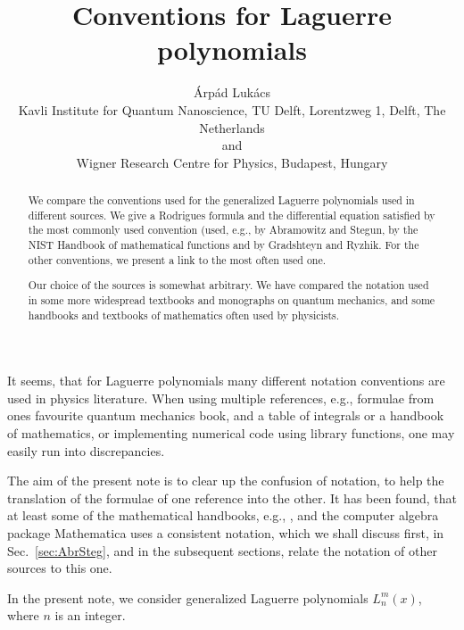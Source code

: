 \documentclass[a4paper,12pt,final]{article}
\title{Conventions for Laguerre polynomials}
\author{Árpád Lukács\\ \small Kavli Institute for Quantum Nanoscience, TU Delft, Lorentzweg 1, Delft, The Netherlands\\
\small and \\ \small Wigner Research Centre for Physics, Budapest, Hungary}
\begin{document}
\maketitle

\begin{abstract}
We compare the conventions used for the generalized Laguerre polynomials used in different sources. We give a Rodrigues formula and the differential equation satisfied by the most commonly used convention (used, e.g., by Abramowitz and Stegun, by the NIST Handbook of mathematical functions and by Gradshteyn and Ryzhik. For the other conventions, we present a link to the most often used one.

Our choice of the sources is somewhat arbitrary. We have compared the notation used in some more widespread textbooks and monographs on quantum mechanics, and some handbooks and textbooks of mathematics often used by physicists.%
\end{abstract}

It seems, that for Laguerre polynomials many different notation conventions are used in physics literature. When using multiple references, e.g., formulae from ones favourite quantum mechanics book, and a table of integrals or a handbook of mathematics, or implementing numerical code using library functions, one may easily run into discrepancies.

The aim of the present note is to clear up the confusion of notation, to help the translation of the formulae of one reference into the other. It has been found, that at least some of the mathematical handbooks, e.g., \cite{AbrSteg, NIST, RG, AWH, Bronshtein, AAR, Askey, Erdelyi, Lebedev, MO, Olver, Prud, SL, Sz}, and the computer algebra package Mathematica \cite{Wolfram} uses a consistent notation, which we shall discuss first, in Sec.\ \ref{sec:AbrSteg}, and in the subsequent sections, relate the notation of other sources to this one.

In the present note, we consider generalized Laguerre polynomials $L_n^m(x)$, where $n$ is an integer.
\end{document}
